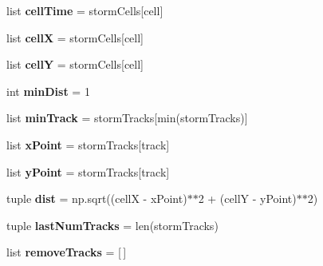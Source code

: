 \begin{DoxyCompactItemize}
\item 
\hypertarget{namespacebest__track_a78952b42cf5c565e474a10bbc55de52c}{list {\bfseries cell\-Time} = storm\-Cells\mbox{[}cell\mbox{]}}\label{namespacebest__track_a78952b42cf5c565e474a10bbc55de52c}

\item 
\hypertarget{namespacebest__track_aea97ed5b17506f4f95d6041ee1434b29}{list {\bfseries cell\-X} = storm\-Cells\mbox{[}cell\mbox{]}}\label{namespacebest__track_aea97ed5b17506f4f95d6041ee1434b29}

\item 
\hypertarget{namespacebest__track_a06da46db644844e8deeb085217b5f4b5}{list {\bfseries cell\-Y} = storm\-Cells\mbox{[}cell\mbox{]}}\label{namespacebest__track_a06da46db644844e8deeb085217b5f4b5}

\item 
\hypertarget{namespacebest__track_acaaf2e58aa6d2cacb20a66e2704f7c03}{int {\bfseries min\-Dist} = 1}\label{namespacebest__track_acaaf2e58aa6d2cacb20a66e2704f7c03}

\item 
\hypertarget{namespacebest__track_a51c7b375515a0cac6bc12ed145c7befa}{list {\bfseries min\-Track} = storm\-Tracks\mbox{[}min(storm\-Tracks)\mbox{]}}\label{namespacebest__track_a51c7b375515a0cac6bc12ed145c7befa}

\item 
\hypertarget{namespacebest__track_a03f0a6ed1fe3d271aa89b524cc62460f}{list {\bfseries x\-Point} = storm\-Tracks\mbox{[}track\mbox{]}}\label{namespacebest__track_a03f0a6ed1fe3d271aa89b524cc62460f}

\item 
\hypertarget{namespacebest__track_af8dd5fc282ab82055fa216ffd1be91c3}{list {\bfseries y\-Point} = storm\-Tracks\mbox{[}track\mbox{]}}\label{namespacebest__track_af8dd5fc282ab82055fa216ffd1be91c3}

\item 
\hypertarget{namespacebest__track_a86d4a703a1db4ad6bb2dde523a49b17b}{tuple {\bfseries dist} = np.\-sqrt((cell\-X -\/ x\-Point)$\ast$$\ast$2 + (cell\-Y -\/ y\-Point)$\ast$$\ast$2)}\label{namespacebest__track_a86d4a703a1db4ad6bb2dde523a49b17b}

\item 
\hypertarget{namespacebest__track_a0e4bcd81ae2df0345bcbec11df76c888}{tuple {\bfseries last\-Num\-Tracks} = len(storm\-Tracks)}\label{namespacebest__track_a0e4bcd81ae2df0345bcbec11df76c888}

\item 
\hypertarget{namespacebest__track_a999feaa05954856f98e6fdc74b7dfee3}{list {\bfseries remove\-Tracks} = \mbox{[}$\,$\mbox{]}}\label{namespacebest__track_a999feaa05954856f98e6fdc74b7dfee3}


\end{DoxyCompactItemize}

